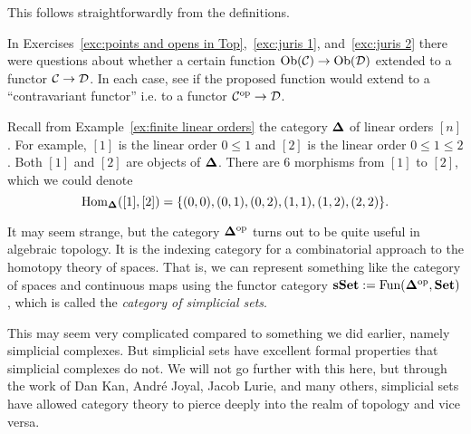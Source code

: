 \documentclass[CT4S-EN-RU]{subfiles}
\begin{document}
\begin{lemmaRUS}
\end{lemmaRUS}

\begin{proofENG}
This follows straightforwardly from the definitions.
\end{proofENG}

\begin{proofRUS}
\end{proofRUS}

\begin{exerciseENG}
In Exercises~\ref{exc:points and opens in Top},~\ref{exc:juris 1}, and~\ref{exc:juris 2} there were questions about whether a certain function $\textnormal{Ob}(\mathcal{C})\rightarrow\textnormal{Ob}(\mathcal{D})$ extended to a functor $\mathcal{C}\rightarrow\mathcal{D}$. In each case, see if the proposed function would extend to a “contravariant functor” i.e. to a functor $\mathcal{C}^\textnormal{op}\rightarrow\mathcal{D}$.
\end{exerciseENG}

\begin{exerciseRUS}
\end{exerciseRUS}

\begin{exampleENG}\label{ex:simplicial set}
Recall from Example~\ref{ex:finite linear orders} the category ${\mathbf{\Delta}}$ of linear orders $[n]$. For example, $[1]$ is the linear order $0\leq 1$ and $[2]$ is the linear order $0\leq 1\leq2$. Both $[1]$ and $[2]$ are objects of ${\mathbf{\Delta}}$. There are 6 morphisms from $[1]$ to $[2]$, which we could denote $$\textnormal{Hom}_{{\mathbf{\Delta}}}([1],[2])=\{(0,0), (0,1), (0,2), (1,1), (1,2), (2,2)\}.$$

It may seem strange, but the category ${\mathbf{\Delta}}^\textnormal{op}$ turns out to be quite useful in algebraic topology. It is the indexing category for a combinatorial approach to the homotopy theory of spaces. That is, we can represent something like the category of spaces and continuous maps using the functor category ${\mathbf{sSet}}:=\textnormal{Fun}({\mathbf{\Delta}}^\textnormal{op},{\mathbf{Set}})$, which is called the {\em category of simplicial sets}. 

This may seem very complicated compared to something we did earlier, namely simplicial complexes. But simplicial sets have excellent formal properties that simplicial complexes do not. We will not go further with this here, but through the work of Dan Kan, Andr\'{e} Joyal, Jacob Lurie, and many others, simplicial sets have allowed category theory to pierce deeply into the realm of topology and vice versa.
\end{exampleENG}
\end{document}
